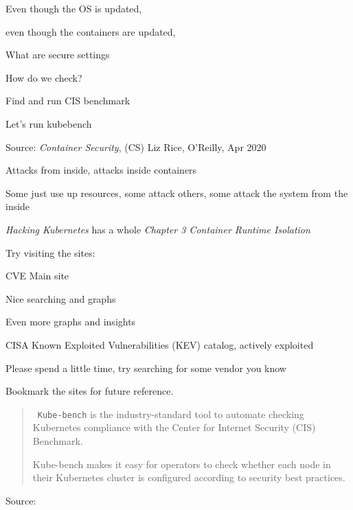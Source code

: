 \documentclass[Screen16to9,17pt]{foils}
\begin{document}
\begin{list2}
\item Even though the OS is updated,
\item even though the containers are updated,
\item What are secure settings
\end{list2}

How do we check?

Find and run CIS benchmark

Let's run kubebench



Source: \emph{Container Security}, (CS) Liz Rice, O'Reilly, Apr 2020

\begin{list2}
\item Attacks from inside, attacks inside containers
\item Some just use up resources, some attack others, some attack the system from the inside
\item \emph{Hacking Kubernetes} has a whole \emph{Chapter 3 Container Runtime Isolation}
\end{list2}



Try visiting the sites:
\begin{list2}
\item CVE Main site 
\item Nice searching and graphs 
\item Even more graphs and insights 
\item CISA Known Exploited Vulnerabilities (KEV) catalog, actively exploited\\
\end{list2}

Please spend a little time, try searching for some vendor you know

Bookmark the sites for future reference.



\begin{quote}
\faWrench\ \verb+Kube-bench+ is the industry-standard tool to automate checking Kubernetes compliance with the Center for Internet Security (CIS) Benchmark.

Kube-bench makes it easy for operators to check whether each node in their Kubernetes cluster is configured according to security best practices.
\end{quote}
Source: 
\end{document}
